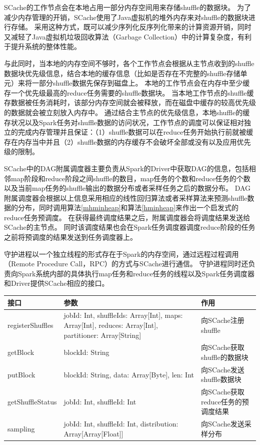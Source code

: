 SCache的工作节点会在本地占用一部分内存空间用来存储shuffle的数据块。
为了减少内存管理的开销，SCache使用了Java虚拟机的堆外内存来对shuffle的数据块进行存储。
采用这种方式，既可以减少序列化反序列化带来的计算资源开销，同时又减轻了Java虚拟机垃圾回收算法（Garbage Collection）中的计算复杂度，有利于提升系统的整体性能。

与此同时，当本地的内存空间不够时，各个工作节点会根据从主节点收到的shuffle数据块优先级信息，结合本地的缓存信息（比如是否存在不完整的shuffle存储单元）来将一部分shuffle数据先保存到磁盘上。
本地的工作节点会在内存中至少缓存一个优先级最高的reduce任务需要的shuffle数据块。
当本地工作节点的shuffle缓存数据被任务消耗时，该部分内存空间就会被释放，而在磁盘中缓存的较高优先级的数据就会被立刻放入内存中。
通过结合主节点的优先级信息，本地shuffle的缓存状况以及Spark任务对shuffle数据的访问状况，工作节点的调度可以保证相对独立的完成内存管理并且保证：（1）shuffle数据可以在reduce任务开始执行前就被缓存在内存当中并且（2）shuffle数据的内存缓存不会破坏全部或没有以及应用优先级的限制。

SCache中的DAG附属调度器主要负责从Spark的Driver中获取DAG的信息，包括相邻map阶段和reduce阶段之间shuffle的数目，map任务的个数和reduce任务的个数以及当前map任务的shuffle输出的数据分布或者采样任务之后的数据分布。
DAG附属调度器会根据以上信息采用相应的线性回归算法或者采样算法来预测shuffle数据的分布，同时调用算法\ref{mhminheap}和算法\ref{hminheap}来作出一个启发式的reduce任务预调度。
在获得最终调度结果之后，附属调度器会将调度结果发送给SCache的主节点。
同时该调度结果也会在Spark任务调度器调度reduce阶段的任务之前将预调度的结果发送到任务调度器上。

守护进程以一个独立线程的形式存在于Spark的内存空间，通过远程过程调用（Remote Procedure Call，RPC）的方式与SCache进行通信。
守护进程同时还负责向Spark系统内部的具体执行map任务和reduce任务的线程以及Spark任务调度器和Driver提供SCache相应的接口。

\begin{table}[!hpb]
    \centering
    \begin{tabular}{ | m{2.5cm} | m{9cm} | m{3.6cm} | }
        \hline
        接口 & 参数 & 作用 \\ [0.5ex]
        \hline
        \hline
        registerShuffles & jobId: Int, shuffleIds: Array[Int], maps: Array[Int], reduces: Array[Int], partitioner: Array[String] & 向SCache注册shuffle \\ \hline
        getBlock & blockId: String & 向SCache获取shuffle的数据块 \\ \hline
        putBlock & blockId: String, data: Array[Byte], len: Int & 向SCache发送shuffle数据块 \\ \hline
        getShuffleStatus & jobId: Int, shuffleId: Int & 向SCache获取reduce任务的预调度结果 \\ \hline
        sampling & jobId: Int, shuffleId: Int, distribution: Array[Array[Float]] & 向SCache发送采样分布 \\ 
        \hline
    \end{tabular}
\end{table}

